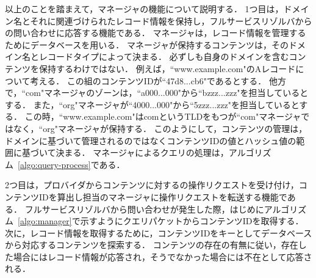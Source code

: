 以上のことを踏まえて，マネージャの機能について説明する．
1つ目は，ドメイン名とそれに関連づけられたレコード情報を保持し，フルサービスリゾルバからの問い合わせに応答する機能である．
マネージャは，レコード情報を管理するためにデータベースを用いる．
マネージャが保持するコンテンツは，そのドメイン名とレコードタイプによって決まる．
必ずしも自身のドメインを含むコンテンツを保持するわけではない．
例えば，``www.example.com"のAレコードについて考える．
この組のコンテンツIDが``47d8...cb6"であるとする．
他方で，``com"マネージャのゾーンは，``a000...000"から``bzzz...zzz"を担当しているとする．
また，``org"マネージャが``4000...000"から``5zzz...zzz"を担当しているとする．
この時，``www.example.com"はcomというTLDをもつが``com"マネージャではなく，``org"マネージャが保持する．
このようにして，コンテンツの管理は，ドメインに基づいて管理されるのではなくコンテンツIDの値とハッシュ値の範囲に基づいて決まる．
マネージャによるクエリの処理は，アルゴリズム~\ref{algo:query-process}である．
\newpage



\newpage
2つ目は，プロバイダからコンテンツに対するの操作リクエストを受け付け，コンテンツIDを算出し担当のマネージャに操作リクエストを転送する機能である．
フルサービスリゾルバから問い合わせが発生した際，はじめにアルゴリズム~\ref{algo:manager}で示すようにクエリパケットからコンテンツIDを取得する．
次に，レコード情報を取得するために，コンテンツIDをキーとしてデータベースから対応するコンテンツを探索する．
コンテンツの存在の有無に従い，存在した場合にはレコード情報が応答され，そうでなかった場合には不在として応答される．


